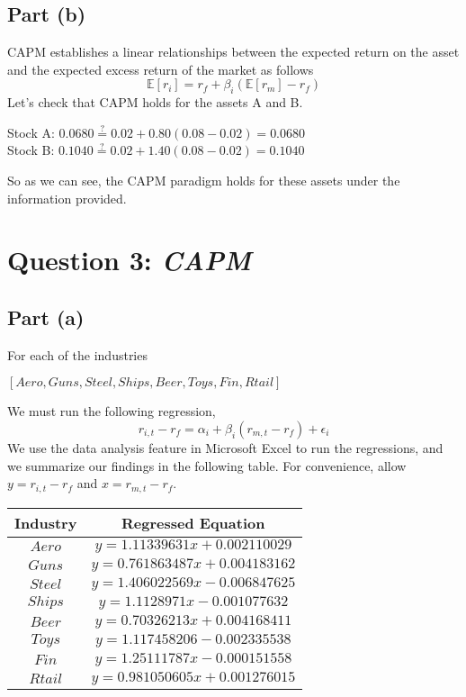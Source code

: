 \documentclass[12pt]{article}
\begin{document}
	\subsection{Part (b)}
	
		CAPM establishes a linear relationships between the expected return on the asset and the expected excess return of the market as follows
		$$ \mathbb{E}[r_{i}] = r_{f} + \beta_{i}(\mathbb{E}[r_{m}] - r_{f}) $$
		Let's check that CAPM holds for the assets A and B.\\
		\begin{center}
		Stock A: $0.0680 \stackrel{?}{=} 0.02 + 0.80(0.08-0.02) = 0.0680$ \\ 
		Stock B: $0.1040 \stackrel{?}{=} 0.02 + 1.40(0.08-0.02) = 0.1040$
		\end{center}
		So as we can see, the CAPM paradigm holds for these assets under the information provided. 
		
\section{Question 3: \textit{CAPM}}

	\subsection{Part (a)}
		
		For each of the industries
		\begin{center}
			$[Aero, Guns, Steel, Ships, Beer, Toys, Fin, Rtail]$
		\end{center}
		We must run the following regression,
		$$ r_{i,t} - r_{f} = \alpha_{i} + \beta_{i}(r_{m,t} - r_{f}) + \epsilon_{i} $$
		We use the data analysis feature in Microsoft Excel to run the regressions, and we summarize our findings in the following table. For convenience,
		allow $y = r_{i,t} - r_{f}$ and $x = r_{m,t} - r_{f}$. 
		\begin{center}
 		\begin{tabular}{||c c||} 
 		\hline
 		 Industry &  Regressed Equation \\ [0.5ex] 
 		\hline \hline
 		$Aero$ & $y = 1.11339631x + 0.002110029$  \\ 
 		\hline
 		$Guns$ & $y = 0.761863487x + 0.004183162$ \\
 		\hline
 		$Steel$ & $y = 1.406022569x - 0.006847625$  \\
 		\hline
 		$Ships$ & $y = 1.1128971x - 0.001077632$  \\
 		\hline
 		$Beer$ & $y = 0.70326213x + 0.004168411$  \\
 		\hline
 		$Toys$ & $y = 1.117458206 - 0.002335538$ \\
 		\hline
 		$Fin$ & $y = 1.25111787x - 0.000151558$ \\
 		\hline
 		$Rtail$ & $y = 0.981050605x + 0.001276015$ \\ 
 		\hline
		\end{tabular}
		\end{center}
		
\end{document}
